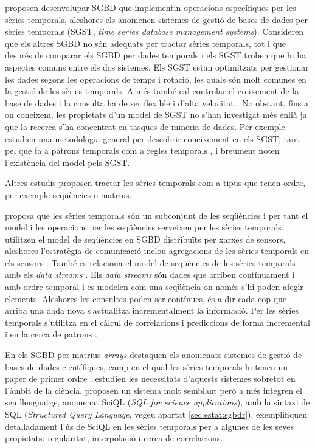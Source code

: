 \textcite{dreyer94} proposen desenvolupar SGBD que implementin operacions específiques per les sèries temporals, aleshores els anomenen sistemes de gestió de bases de dades per sèries temporals (SGST, \emph{time series database management systems}). Consideren que els altres SGBD no són adequats per tractar sèries temporals, tot i que després de comparar els SGBD per dades temporals i els SGST \parencite{schmidt95} troben que hi ha aspectes comuns entre els dos sistemes.
Els SGST estan optimitzats per gestionar les dades segons les operacions de temps i rotació, les quals són molt comunes en la gestió de les sèries temporals.  A més també cal controlar el creixement de la base de dades i la consulta ha de ser flexible i d'alta velocitat \parencite{keogh10:isax}. 
No obstant, fins a on coneixem, les propietats d'un model de SGST no s'han investigat més enllà  ja que la recerca s'ha concentrat en tasques de mineria de dades. Per exemple \textcite{last01} estudien una metodologia general per descobrir coneixement en els SGST, tant pel que fa a 
patrons temporals %
com a regles temporals%
, i breument noten l'existència del model \cite{dreyer94} pels SGST.


Altres estudis proposen tractar les sèries temporals com a tipus que tenen ordre, per exemple seqüències o matrius.

\textcite{seshadri96:thesis} proposa que les sèries temporals són un subconjunt de les seqüències i per tant el model i les operacions per les seqüències \parencite{seshadri95} serveixen per les sèries temporals. 
\textcite{bonnet01} utilitzen el model de seqüències en SGBD distribuïts per xarxes de sensors, aleshores l'estratègia de comunicació inclou agregacions de les sèries temporals en els sensors \parencite{demers03}.
També es relaciona el model de seqüències de les sèries temporals amb els \emph{data streams} \parencite{babcock02,jagadish95,ogras06}. Els \emph{data streams} són dades que arriben contínuament i amb ordre temporal i es modelen com una seqüència on només s'hi poden afegir elements. Aleshores les consultes poden ser contínues, és a dir cada cop que arriba una dada nova s'actualitza incrementalment la informació. Per les sèries temporals s'utilitza en el càlcul de correlacions i prediccions de forma incremental \parencite{yi00} i en la cerca de patrons \parencite{bai05}.

En els SGBD per matrius \emph{arrays} destaquen els anomenats sistemes
de gestió de bases de dades científiques, camp en el qual les sèries
temporals hi tenen un paper de primer
ordre \parencite{zhang11}. \textcite{stonebraker09:scidb} estudien les
necessitats d'aquests sistemes sobretot en l'àmbit de la
ciència. \textcite{kersten11} proposen un sistema molt semblant però a
més integren el seu llenguatge, anomenat SciQL (\emph{SQL for
  science applications}), amb la sintaxi de SQL (\emph{Structured Query Language},
vegeu apartat \ref{sec:estat:sgbdr}). \textcite{zhang11} exemplifiquen
detalladament l'ús de SciQL en les sèries temporals per a algunes de
les seves propietats: regularitat, interpolació i cerca de
correlacions.




